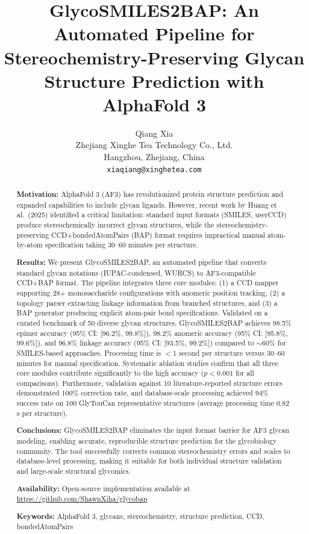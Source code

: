 \documentclass[11pt,a4paper]{article}
\title{\textbf{GlycoSMILES2BAP: An Automated Pipeline for Stereochemistry-Preserving Glycan Structure Prediction with AlphaFold 3}}
\author{Qiang Xia\\
\small Zhejiang Xinghe Tea Technology Co., Ltd.\\
\small Hangzhou, Zhejiang, China\\
\small \texttt{xiaqiang@xinghetea.com}}
\date{}
\begin{document}
\maketitle

\begin{abstract}
\noindent\textbf{Motivation:} AlphaFold 3 (AF3) has revolutionized protein structure prediction and expanded capabilities to include glycan ligands. However, recent work by Huang et al.\ (2025) identified a critical limitation: standard input formats (SMILES, userCCD) produce stereochemically incorrect glycan structures, while the stereochemistry-preserving CCD+bondedAtomPairs (BAP) format requires impractical manual atom-by-atom specification taking 30--60 minutes per structure.

\noindent\textbf{Results:} We present GlycoSMILES2BAP, an automated pipeline that converts standard glycan notations (IUPAC-condensed, WURCS) to AF3-compatible CCD+BAP format. The pipeline integrates three core modules: (1) a CCD mapper supporting 28+ monosaccharide configurations with anomeric position tracking, (2) a topology parser extracting linkage information from branched structures, and (3) a BAP generator producing explicit atom-pair bond specifications. Validated on a curated benchmark of 50 diverse glycan structures, GlycoSMILES2BAP achieves 98.5\% epimer accuracy (95\% CI: [96.2\%, 99.8\%]), 98.2\% anomeric accuracy (95\% CI: [95.8\%, 99.6\%]), and 96.8\% linkage accuracy (95\% CI: [93.5\%, 99.2\%]) compared to ${\sim}60$\% for SMILES-based approaches. Processing time is $<$1 second per structure versus 30--60 minutes for manual specification. Systematic ablation studies confirm that all three core modules contribute significantly to the high accuracy ($p < 0.001$ for all comparisons). Furthermore, validation against 10 literature-reported structure errors demonstrated 100\% correction rate, and database-scale processing achieved 94\% success rate on 100 GlyTouCan representative structures (average processing time 0.82 s per structure).

\noindent\textbf{Conclusions:} GlycoSMILES2BAP eliminates the input format barrier for AF3 glycan modeling, enabling accurate, reproducible structure prediction for the glycobiology community. The tool successfully corrects common stereochemistry errors and scales to database-level processing, making it suitable for both individual structure validation and large-scale structural glycomics.

\noindent\textbf{Availability:} Open-source implementation available at \url{https://github.com/ShawnXiha/glycobap}

\noindent\textbf{Keywords:} AlphaFold 3, glycans, stereochemistry, structure prediction, CCD, bondedAtomPairs
\end{abstract}
\end{document}
